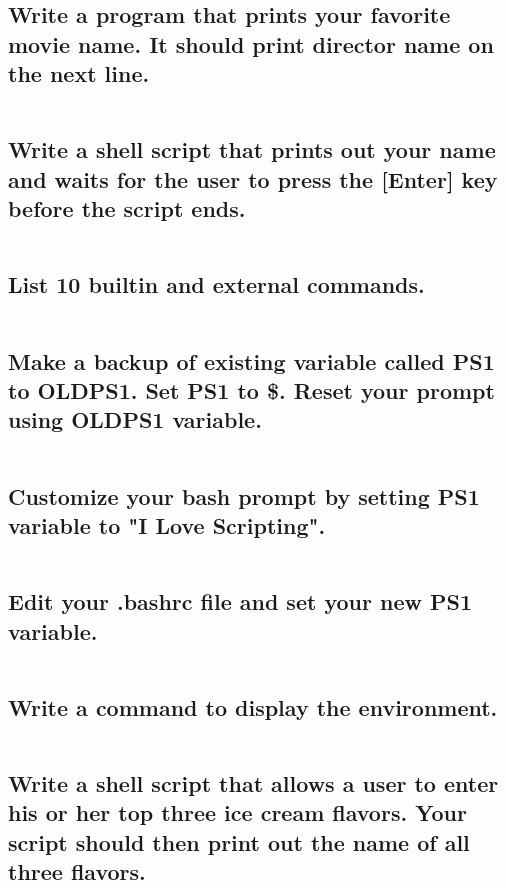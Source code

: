 \subsection{
Write a program that prints your favorite movie name. It should print director name on the next line.
}

\inputminted[breaklines, linenos]{shell}{25-09-2020/01.sh}
\subsection{
Write a shell script that prints out your name and waits for the user to press the [Enter] key before the script ends.
}

\inputminted[breaklines, linenos]{shell}{25-09-2020/02.sh}
\subsection{
List 10 builtin and external commands.
}

\inputminted[breaklines, linenos]{shell}{25-09-2020/03.sh}

\subsection{
Make a backup of existing variable called PS1 to OLDPS1. Set PS1 to \$. Reset your prompt using OLDPS1 variable.
}

\inputminted[breaklines, linenos]{shell}{25-09-2020/05.sh}
\subsection{
Customize your bash prompt by setting PS1 variable to "I Love Scripting".
}
\inputminted[breaklines, linenos]{shell}{25-09-2020/06.sh}
\subsection{
Edit your .bashrc file and set your new PS1 variable.
}

\inputminted[breaklines, linenos]{shell}{25-09-2020/07.sh}
\subsection{
Write a command to display the environment.
}

\inputminted[breaklines, linenos]{shell}{25-09-2020/08.sh}

\subsection{
Write a shell script that allows a user to enter his or her top three ice cream flavors. Your script should then print out the name of all three flavors.
}

